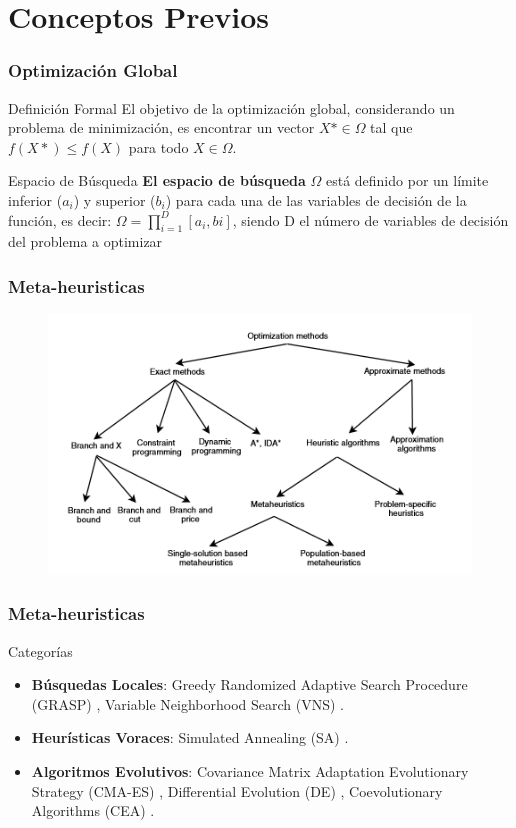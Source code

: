 
\section{Conceptos Previos}

\begin{frame}
    \frametitle{Optimización Global}
    \begin{block}{Definición Formal}
    El objetivo de la optimización global, considerando un problema de minimización, es encontrar un vector $X* \in \Omega$ tal que $f(X*) \leq f(X)$ para todo $X \in \Omega$.
    \end{block}
    \begin{block}{Espacio de Búsqueda}
    \textbf{El espacio de búsqueda} $\Omega$ está definido por un límite inferior ($a_{i}$) y superior ($b_{i}$) para cada una de las variables de decisión de la función, es decir: $\Omega = \prod^{D}_{i=1}[a_{i}, b{i}]$, siendo D el número de variables de decisión del problema a optimizar \citep{Segredo2017}
    \end{block}
\end{frame}

\begin{frame} %
\frametitle{Meta-heuristicas}
\begin{figure}
  \centering
	\includegraphics[scale=0.25]{img/meta}
\end{figure}
\end{frame}

\begin{frame}
\frametitle{Meta-heuristicas}
\begin{block}{Categorías}
\begin{itemize}
    \item \textbf{Búsquedas Locales}: Greedy Randomized Adaptive Search Procedure (GRASP) \cite{GRASP}, Variable Neighborhood Search (VNS) \cite{vns}.
    \item \textbf{Heurísticas Voraces}: Simulated Annealing (SA) \cite{SA}.
    \item \textbf{Algoritmos Evolutivos}: Covariance Matrix Adaptation Evolutionary Strategy (CMA-ES) \cite{CMA}, Differential Evolution (DE) \cite{DE1, DE2, DE3}, Coevolutionary Algorithms (CEA) \cite{COE1, COE2, COE3}.
\end{itemize}
\end{block}
\end{frame}

